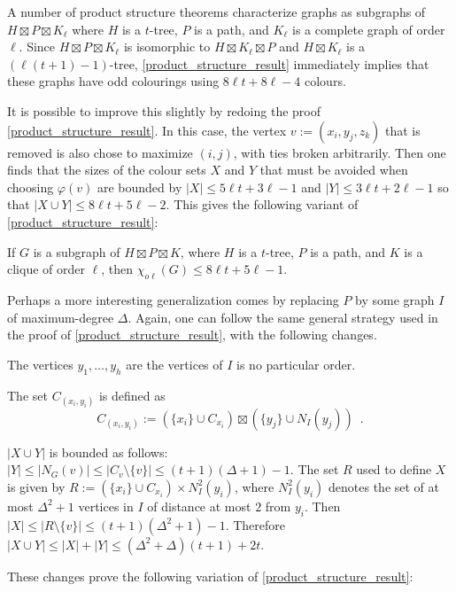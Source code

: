 \documentclass{patmorin}
\newcommand{\oddc}{\chi_{o\ell}}
\begin{document}

A number of product structure theorems characterize graphs as subgraphs of $H\boxtimes P\boxtimes K_{\ell}$ where $H$ is a $t$-tree, $P$ is a path, and $K_\ell$ is a complete graph of order $\ell$.  Since $H\boxtimes P\boxtimes K_{\ell}$ is isomorphic to $H\boxtimes K_\ell\boxtimes P$ and $H\boxtimes K_\ell$ is a $(\ell(t+1)-1)$-tree, \cref{product_structure_result} immediately implies that these graphs have odd colourings using $8\ell t+8\ell-4$ colours.

It is possible to improve this slightly by redoing the proof \cref{product_structure_result}.  In this case, the vertex $v:=(x_i,y_j,z_k)$ that is removed is also chose to maximize $(i,j)$, with ties broken arbitrarily. Then one finds that the sizes of the colour sets $X$ and $Y$ that must be avoided when choosing $\varphi(v)$ are bounded by $|X|\le 5\ell t + 3\ell-1$ and $|Y|\le 3\ell t + 2\ell -1$ so that $|X\cup Y|\le 8\ell t + 5\ell -2$. This gives the following variant of \cref{product_structure_result}:

\begin{thm}\label{product_structure_result_kl}
  If $G$ is a subgraph of $H\boxtimes P\boxtimes K$, where $H$ is a $t$-tree, $P$ is a path, and $K$ is a clique of order $\ell$, then $\oddc(G)\le 8\ell t + 5\ell -1$.
\end{thm}


Perhaps a more interesting generalization comes by replacing $P$ by some graph $I$ of maximum-degree $\Delta$.  Again, one can follow the same general strategy used in the proof of \cref{product_structure_result}, with the following changes.
\begin{compactitem}
  \item The vertices $y_1,\ldots,y_h$ are the vertices of $I$ is no particular order.
  \item The set $C_{(x_i,y_i)}$ is defined as
\[
    C_{(x_i,y_i)}:=(\{x_i\}\cup C_{x_i})\boxtimes (\{y_j\}\cup N_I(y_j)) \enspace .
\]
  \item $|X\cup Y|$ is bounded as follows: $|Y|\le|N_G(v)|\le |C_v\setminus\{v\}| \le (t+1)(\Delta+1)-1$.  The set $R$ used to define $X$ is given by $R:=(\{x_i\}\cup C_{x_i})\times N^2_I(y_i)$, where $N^2_I(y_i)$ denotes the set of at most $\Delta^2+1$ vertices in $I$ of distance at most $2$ from $y_i$.  Then $|X|\le|R\setminus\{v\}|\le (t+1)(\Delta^2+1)-1$.  Therefore $|X\cup Y|\le |X|+|Y|\le (\Delta^2+\Delta)(t+1)+2t$.
\end{compactitem}
These changes prove the following variation of \cref{product_structure_result}:
\end{document}
